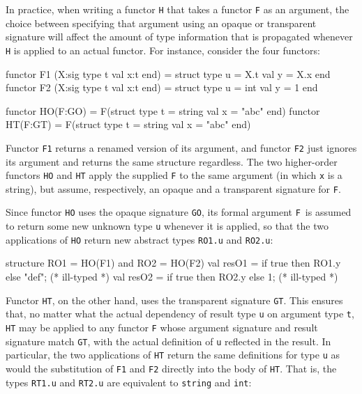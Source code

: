 \documentclass[fleqn,a4paper]{article}
\begin{document}
In practice, when writing a functor \texttt{H} that 
takes a functor \texttt{F} as an argument,
the choice between specifying that argument using an opaque
or transparent signature will affect the amount of 
type information that is propagated whenever \texttt{H}
is applied to an actual functor.
For instance, consider the four functors:

\begin{program}
functor F1 (X:sig type t val x:t end) = struct type u = X.t val y = X.x end
functor F2 (X:sig type t val x:t end) = struct type u = int val y = 1 end

functor HO(F:GO) = F(struct type t = string val x = "abc" end)
functor HT(F:GT) = F(struct type t = string val x = "abc" end)
\end{program}

\noindent
Functor \texttt{F1} returns a renamed version of its argument, and
functor \texttt{F2} just ignores its argument and returns the same
structure regardless.  The two higher-order functors \texttt{HO} and
\texttt{HT} apply the supplied \texttt{F} to the same argument (in
which \texttt{x} is a string), but assume, respectively, an opaque and
a transparent signature for \texttt{F}.

Since functor \texttt{HO} uses the opaque signature \texttt{GO}, its
formal argument \texttt{F}\ is assumed to return some new unknown type
\texttt{u} whenever it is applied, so that the two applications of
\texttt{HO} return new abstract types \texttt{RO1.u} and
\texttt{RO2.u}:

\begin{program}
structure RO1 = HO(F1) and RO2 = HO(F2)
val resO1 = if true then RO1.y else "def";            (* ill-typed *) 
val resO2 = if true then RO2.y else 1;                (* ill-typed *) 
\end{program}

\noindent 
Functor \texttt{HT}, on the other hand, uses the transparent signature
\texttt{GT}\@.  This ensures that, no matter what the actual
dependency of result type \texttt{u} on argument type \texttt{t},
\texttt{HT} may be applied to any functor \texttt{F} whose argument
signature and result signature match \texttt{GT}, with the actual
definition of \texttt{u} reflected in the result.  In particular, the
two applications of \texttt{HT} return the same definitions for type
\texttt{u} as would the substitution of \texttt{F1} and \texttt{F2}
directly into the body of \texttt{HT}\@.  That is, the types
\texttt{RT1.u} and \texttt{RT2.u} are equivalent to \texttt{string}
and \texttt{int}:
\end{document}
